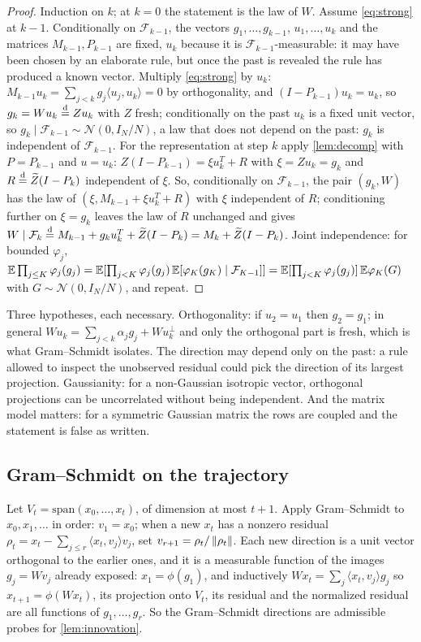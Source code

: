 \begin{proof}
Induction on $k$; at $k=0$ the statement is the law of $W$. Assume \cref{eq:strong} at $k-1$. Conditionally on $\mathcal F_{k-1}$, the vectors $g_1,\dots,g_{k-1}$, $u_1,\dots,u_k$ and the matrices $M_{k-1},P_{k-1}$ are fixed, $u_k$ because it is $\mathcal F_{k-1}$-measurable: it may have been chosen by an elaborate rule, but once the past is revealed the rule has produced a known vector. Multiply \cref{eq:strong} by $u_k$: $M_{k-1}u_k=\sum_{j<k}g_j\langle u_j,u_k\rangle=0$ by orthogonality, and $(I-P_{k-1})u_k=u_k$, so $g_k=Wu_k\overset{\mathrm{d}}{=} Zu_k$ with $Z$ fresh; conditionally on the past $u_k$ is a fixed unit vector, so $g_k\mid\mathcal F_{k-1}\sim\mathcal N(0,I_N/N)$, a law that does not depend on the past: $g_k$ is independent of $\mathcal F_{k-1}$. For the representation at step $k$ apply \cref{lem:decomp} with $P=P_{k-1}$ and $u=u_k$: $Z(I-P_{k-1})=\xi u_k^T+R$ with $\xi=Zu_k=g_k$ and $R\overset{\mathrm{d}}{=}\widetilde Z(I-P_k)$ independent of $\xi$. So, conditionally on $\mathcal F_{k-1}$, the pair $(g_k,W)$ has the law of $(\xi,M_{k-1}+\xi u_k^T+R)$ with $\xi$ independent of $R$; conditioning further on $\xi=g_k$ leaves the law of $R$ unchanged and gives $W\mid\mathcal F_k\overset{\mathrm{d}}{=} M_{k-1}+g_ku_k^T+\widetilde Z(I-P_k)=M_k+\widetilde Z(I-P_k)$. Joint independence: for bounded $\varphi_j$, $\mathbb{E}\prod_{j\le K}\varphi_j(g_j)=\mathbb{E}[\prod_{j<K}\varphi_j(g_j)\,\mathbb{E}[\varphi_K(g_K)\mid\mathcal F_{K-1}]]=\mathbb{E}[\prod_{j<K}\varphi_j(g_j)]\,\mathbb{E}\varphi_K(G)$ with $G\sim\mathcal N(0,I_N/N)$, and repeat.
\end{proof}

Three hypotheses, each necessary. Orthogonality: if $u_2=u_1$ then $g_2=g_1$; in general $Wu_k=\sum_{j<k}\alpha_jg_j+Wu_k^\perp$ and only the orthogonal part is fresh, which is what Gram--Schmidt isolates. The direction may depend only on the past: a rule allowed to inspect the unobserved residual could pick the direction of its largest projection. Gaussianity: for a non-Gaussian isotropic vector, orthogonal projections can be uncorrelated without being independent. And the matrix model matters: for a symmetric Gaussian matrix the rows are coupled and the statement is false as written.

\subsection{Gram--Schmidt on the trajectory}

Let $V_t=\mathrm{span}(x_0,\dots,x_t)$, of dimension at most $t+1$. Apply Gram--Schmidt to $x_0,x_1,\dots$ in order: $v_1=x_0$; when a new $x_t$ has a nonzero residual $\rho_t=x_t-\sum_{j\le r}\langle x_t,v_j\rangle v_j$, set $v_{r+1}=\rho_t/\left\lVert \rho_t\right\rVert$. Each new direction is a unit vector orthogonal to the earlier ones, and it is a measurable function of the images $g_j=Wv_j$ already exposed: $x_1=\phi(g_1)$, and inductively $Wx_t=\sum_j\langle x_t,v_j\rangle g_j$ so $x_{t+1}=\phi(Wx_t)$, its projection onto $V_t$, its residual and the normalized residual are all functions of $g_1,\dots,g_r$. So the Gram--Schmidt directions are admissible probes for \cref{lem:innovation}.

